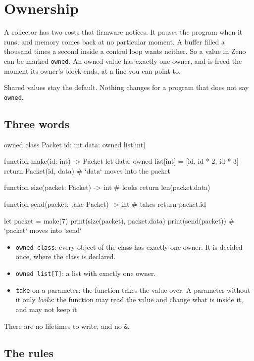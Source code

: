 \chapter{Ownership}\label{ch-ownership}

A collector has two costs that firmware notices. It pauses the
program when it runs, and memory comes back at no particular moment. A
buffer filled a thousand times a second inside a control loop wants
neither. So a value in Zeno can be marked \verb|owned|. An owned value
has exactly one owner, and is freed the moment its owner's block ends,
at a line you can point to.

Shared values stay the default. Nothing changes for a program that
does not say \verb|owned|.

\section{Three words}

\begin{zeno}
owned class Packet {
    id: int
    data: owned list[int]
}

function make(id: int) -> Packet {
    let data: owned list[int] = [id, id * 2, id * 3]
    return Packet(id, data)       # `data` moves into the packet
}

function size(packet: Packet) -> int {      # looks
    return len(packet.data)
}

function send(packet: take Packet) -> int {  # takes
    return packet.id
}

let packet = make(7)
print(size(packet), packet.data)
print(send(packet))               # `packet` moves into `send`
\end{zeno}

\begin{itemize}
\item \verb|owned class|: every object of the class has exactly one
  owner. It is decided once, where the class is declared.
\item \verb|owned list[T]|: a list with exactly one owner.
\item \verb|take| on a parameter: the function takes the value over. A
  parameter without it only \emph{looks}: the function may read the
  value and change what is inside it, and may not keep it.
\end{itemize}

There are no lifetimes to write, and no \verb|&|.

\section{The rules}

